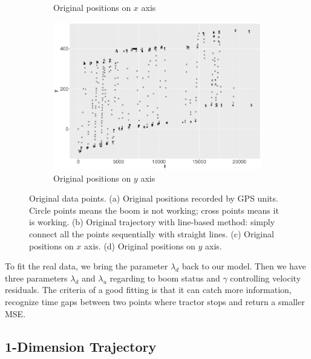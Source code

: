 \begin{figure}
\begin{subfigure}{0.45\textwidth}
    \caption{Original positions on $x$ axis  }
    \end{subfigure}
    \begin{subfigure}{0.45\textwidth}
    \centering
    \includegraphics[width=\linewidth,height=0.5\textwidth]{Chapters/02TractorSplineTheory/plot/ggplot/gg512PointsY.pdf}
    \caption{Original positions on $y$ axis  }
    \end{subfigure}
\caption{Original data points. (a) Original positions recorded by GPS units. Circle points means the boom is not working; cross points means it is working. (b) Original trajectory with line-based method: simply connect all the points sequentially with straight lines. (c) Original positions on $x$ axis. (d)  Original positions on $y$ axis.}\label{original512}
 \end{figure}




To fit the real data, we bring the parameter $\lambda_d$ back to our model. Then we have three parameters $\lambda_d$ and $\lambda_u$ regarding to boom status and $\gamma$ controlling velocity residuals. The criteria of a good fitting is that it can catch more information, recognize time gaps between two points where tractor stops and return a smaller MSE. 

\subsection{1-Dimension Trajectory}

